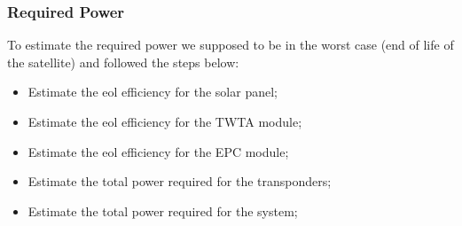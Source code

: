 \documentclass[11pt,a4paper,titlepage]{article}
\begin{document}
		\subsubsection{Required Power}
			To estimate the required power we supposed to be in the worst case (end of life of the satellite) and followed the steps below:
	\begin{itemize}
	\item Estimate the \gls{eol} efficiency for the solar panel;
	\item Estimate the \gls{eol} efficiency for the TWTA module;
	\item Estimate the \gls{eol} efficiency for the EPC module;
	\item Estimate the total power required for the transponders;
	\item Estimate the total power required for the system;
	\end{itemize}
\end{document}

